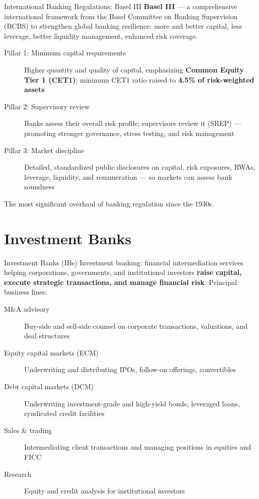 \documentclass[aspectratio=169]{beamer}
\begin{document}
\begin{frame}{International Banking Regulations: Basel III}
\textbf{Basel III} --- a comprehensive international framework from the Basel Committee on Banking Supervision (BCBS) to strengthen global banking resilience: more and better capital, less leverage, better liquidity management, enhanced risk coverage.
\begin{description}
  \item[Pillar 1: Minimum capital requirements] Higher quantity and quality of capital, emphasizing \textbf{Common Equity Tier 1 (CET1)}; minimum CET1 ratio raised to \textbf{4.5\% of risk-weighted assets}
  \item[Pillar 2: Supervisory review] Banks assess their overall risk profile; supervisors review it (SREP) --- promoting stronger governance, stress testing, and risk management
  \item[Pillar 3: Market discipline] Detailed, standardized public disclosures on capital, risk exposures, RWAs, leverage, liquidity, and remuneration --- so markets can assess bank soundness
\end{description}
\vspace{0.2em}
The most significant overhaul of banking regulation since the 1930s.
\end{frame}


\section{Investment Banks}

\begin{frame}{Investment Banks (IBs)}
Investment banking: financial intermediation services helping corporations, governments, and institutional investors \textbf{raise capital, execute strategic transactions, and manage financial risk}. Principal business lines:
\begin{description}
  \item[M\&A advisory] Buy-side and sell-side counsel on corporate transactions, valuations, and deal structures
  \item[Equity capital markets (ECM)] Underwriting and distributing IPOs, follow-on offerings, convertibles
  \item[Debt capital markets (DCM)] Underwriting investment-grade and high-yield bonds, leveraged loans, syndicated credit facilities
  \item[Sales \& trading] Intermediating client transactions and managing positions in equities and FICC
  \item[Research] Equity and credit analysis for institutional investors
\end{description}
\end{frame}
\end{document}
